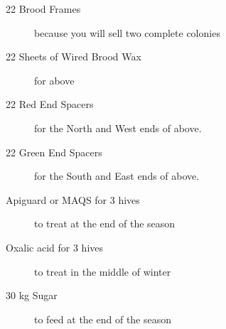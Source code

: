 \documentclass{./BeekeepingBook}
\begin{document}
\begin{description}
  \item[22 Brood Frames] because you will sell two complete colonies
  \item[22 Sheets of Wired Brood Wax] for above 
  \item[22 Red End Spacers] for the North and West ends of above.
  \item[22 Green End Spacers] for the South and East ends of above.
  \item[Apiguard or MAQS for 3 hives] to treat at the end of the season
  \item[Oxalic acid for 3 hives] to treat in the middle of winter
  \item[30 kg Sugar] to feed at the end of the season
\end{description}
\end{document}
